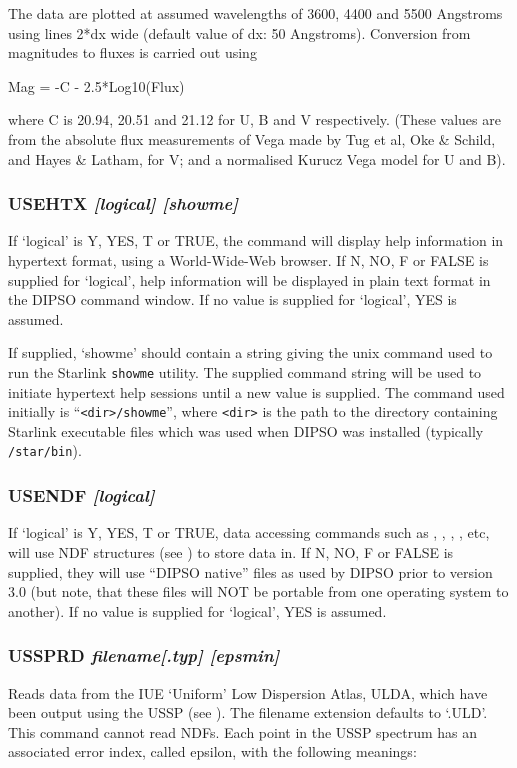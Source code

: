 \documentclass[twoside,11pt,noabs,nolof]{starlink}
\providecommand{\dipcom}[3]{\subsubsection*{\label{COM:#1}\xlabel{COM:#1}\textbf{#1} \emph{#2}}}
\begin{document}
The data are plotted at assumed wavelengths of 3600, 4400 and 5500
Angstroms using lines 2*dx wide (default value of dx: 50 Angstroms).
Conversion from magnitudes to fluxes is carried out using

\begin{terminalv}
Mag = -C - 2.5*Log10(Flux)
\end{terminalv}

where C is 20.94, 20.51 and 21.12 for U, B and V respectively. (These
values are from the absolute flux measurements of Vega made by Tug et
al, Oke \& Schild, and Hayes \& Latham, for V; and a normalised Kurucz
Vega model for U and B).

\dipcom{USEHTX}{[logical] [showme]}{Selects hypertext or plain text format for help information}
If `logical' is Y, YES, T or TRUE, the 
command will display help information in hypertext format, using a
World-Wide-Web browser.
If N, NO, F or FALSE is supplied for `logical', help information will be
displayed in plain text format in the DIPSO command window. If no value
is supplied for `logical', YES is assumed.

If supplied, `showme' should contain a string giving the unix command
used to run the Starlink \texttt{showme} utility. The supplied command
string will be used to initiate hypertext help sessions until a new value
is supplied. The command used initially is ``\verb+<dir>/showme+'', where
\verb+<dir>+ is the path to the directory containing Starlink executable
files which was used when DIPSO was installed (typically \texttt{/star/bin}).

\dipcom{USENDF}{[logical]}{Selects NDF or 'native DIPSO' binary file format}
If `logical' is Y, YES, T or TRUE, data accessing commands such as
, ,
,  ,  etc,
will use NDF structures (see ) to store data in. If
N, NO, F or FALSE is supplied, they will use ``DIPSO native'' files as
used by DIPSO prior to version 3.0 (but note, that these files will NOT
be portable from one operating system to another). If no value is
supplied for `logical', YES is assumed.

\dipcom{USSPRD}{filename[.typ] [epsmin]}{Reads an IUE ULDA spectrum as produced by USSP }
Reads data from the IUE `Uniform' Low Dispersion Atlas, ULDA, which have been
output using the USSP (see ). The filename extension defaults to `.ULD'.
This command cannot read NDFs. Each point in the USSP spectrum has an associated
error index, called epsilon, with the following meanings:
\end{document}
